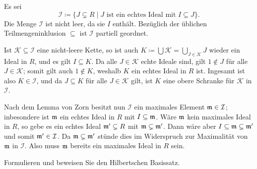 \begin{solution}
  Es sei
  \[
              \mathcal{I}
    \coloneqq \{J \subsetneq R \mid \text{$J$ ist ein echtes Ideal mit $I \subseteq J$}\}.
  \]
  Die Menge $\mathcal{I}$ ist nicht leer, da sie $I$ enthält.
  Bezüglich der üblichen Teilmengeninklusion $\subseteq$ ist $\mathcal{I}$ partiell geordnet.
  
  Ist $\mathcal{K} \subseteq \mathcal{I}$ eine nicht-leere Kette, so ist auch $K \coloneqq \bigcup \mathcal{K} = \bigcup_{J \in \mathcal{K}} J$ wieder ein Ideal in $R$, und es gilt $I \subseteq K$.
  Da alle $J \in \mathcal{K}$ echte Ideale sind, gilt $1 \notin J$ für alle $J \in \mathcal{K}$;
  somit gilt auch $1 \notin K$, weshalb $K$ ein echtes Ideal in $R$ ist.
  Ingesamt ist also $K \in \mathcal{I}$, und da $J \subseteq K$ für alle $J \in \mathcal{K}$ gilt, ist $K$ eine obere Schranke für $\mathcal{K}$ in $\mathcal{I}$.
  
  Nach dem Lemma von Zorn besitzt nun $\mathcal{I}$ ein maximales Element $\mathfrak{m} \in \mathcal{I}$;
  inbesondere ist $\mathfrak{m}$ ein echtes Ideal in $R$ mit $I \subseteq \mathfrak{m}$.
  Wäre $\mathfrak{m}$ kein maximales Ideal in $R$, so gebe es ein echtes Ideal $\mathfrak{m}' \subsetneq R$ mit $\mathfrak{m} \subsetneq \mathfrak{m}'$.
  Dann wäre aber $I \subseteq \mathfrak{m} \subsetneq \mathfrak{m}'$ und somit $\mathfrak{m}' \in \mathcal{I}$. Da $\mathfrak{m} \subsetneq \mathfrak{m}'$ stünde dies im Widerspruch zur Maximalität von $\mathfrak{m}$ in $\mathcal{I}$.
  Also muss $\mathfrak{m}$ bereits ein maximales Ideal in $R$ sein.
\end{solution}


\begin{question}[subtitle = Der Hilbertsche Basissatz]
  Formulieren und beweisen Sie den Hilbertschen Basissatz.
\end{question}


